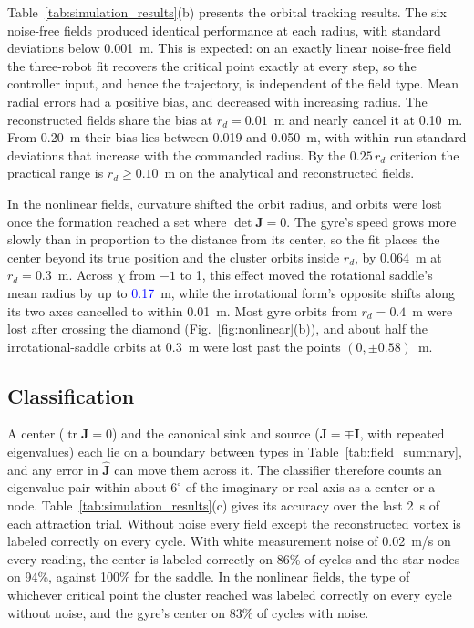 \documentclass[lettersize,journal]{IEEEtran}
\newcommand{\rev}[1]{#1}
\newcommand{\newnum}[1]{\textcolor{blue}{#1}}
\begin{document}
    Table~\ref{tab:simulation_results}(b) presents the orbital tracking results. The six noise-free fields produced identical performance at each radius, with standard deviations below \rev{0.001}~m. This is expected: on an exactly linear noise-free field the three-robot fit recovers the critical point exactly at every step, so the controller input, and hence the trajectory, is independent of the field type. Mean radial errors had a positive bias, and decreased with increasing radius. The reconstructed fields share the bias at $r_d = 0.01$~m and nearly cancel it at 0.10~m. From 0.20~m their bias lies between \rev{0.019} and \rev{0.050}~m, with within-run standard deviations that increase with the commanded radius. By the $0.25\,r_d$ criterion the practical range is $r_d \ge \rev{0.10}$~m on the analytical and reconstructed fields.

In the nonlinear fields, curvature shifted the orbit radius, and orbits were lost once the formation reached a set where $\det\mathbf{J} = 0$. The gyre's speed grows more slowly than in proportion to the distance from its center, so the fit places the center beyond its true position and the cluster orbits inside $r_d$, by \rev{0.064}~m at $r_d = 0.3$~m. Across $\chi$ from $-1$ to 1, this effect moved the rotational saddle's mean radius by up to \newnum{0.17}~m, while the irrotational form's opposite shifts along its two axes cancelled to within \rev{0.01}~m. Most gyre orbits from $r_d = 0.4$~m were lost after crossing the diamond (Fig.~\ref{fig:nonlinear}(b)), and about half the irrotational-saddle orbits at 0.3~m were lost past the points $(0, \pm 0.58)$~m.

\subsection{Classification}

A center ($\operatorname{tr}\mathbf{J} = 0$) and the canonical sink and source ($\mathbf{J} = \mp\mathbf{I}$, with repeated eigenvalues) each lie on a boundary between types in Table~\ref{tab:field_summary}, and any error in $\hat{\mathbf{J}}$ can move them across it. The classifier therefore counts an eigenvalue pair within about $6^\circ$ of the imaginary or real axis as a center or a node. Table~\ref{tab:simulation_results}(c) gives its accuracy over the last 2~s of each attraction trial. Without noise every field except the reconstructed vortex is labeled correctly on every cycle. With white measurement noise of 0.02~m/s on every reading, the center is labeled correctly on \rev{86}\% of cycles and the star nodes on \rev{94}\%, against \rev{100}\% for the saddle. In the nonlinear fields, the type of whichever critical point the cluster reached was labeled correctly on every cycle without noise, and the gyre's center on \rev{83}\% of cycles with noise.
\end{document}

